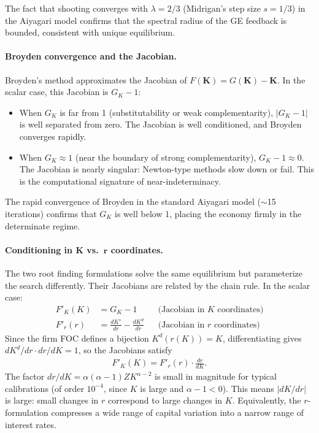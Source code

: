 \documentclass[12pt]{article}
\begin{document}
\noindent The fact that shooting converges with $\lambda = 2/3$ (Midrigan's step size $s = 1/3$) in the Aiyagari model confirms that the spectral radius of the GE feedback is bounded, consistent with unique equilibrium.

\paragraph{Broyden convergence and the Jacobian.} Broyden's method approximates the Jacobian of $F(\mathbf{K}) = G(\mathbf{K}) - \mathbf{K}$. In the scalar case, this Jacobian is $G_K - 1$:
\begin{itemize}[nosep]
    \item When $G_K$ is far from 1 (substitutability or weak complementarity), $|G_K - 1|$ is well separated from zero. The Jacobian is well conditioned, and Broyden converges rapidly.
    \item When $G_K \approx 1$ (near the boundary of strong complementarity), $G_K - 1 \approx 0$. The Jacobian is nearly singular: Newton-type methods slow down or fail. This is the computational signature of near-indeterminacy.
\end{itemize}

\noindent The rapid convergence of Broyden in the standard Aiyagari model ($\sim$15 iterations) confirms that $G_K$ is well below 1, placing the economy firmly in the determinate regime.

\paragraph{Conditioning in $\mathbf{K}$ vs.\ $\mathbf{r}$ coordinates.} The two root finding formulations solve the same equilibrium but parameterize the search differently. Their Jacobians are related by the chain rule. In the scalar case:
\begin{align}
    F'_K(K) &= G_K - 1 & &\text{(Jacobian in $K$ coordinates)} \label{eq:jac_K} \\
    F'_r(r) &= \frac{dK^s}{dr} - \frac{dK^d}{dr} & &\text{(Jacobian in $r$ coordinates)} \label{eq:jac_r}
\end{align}
Since the firm FOC defines a bijection $K^d(r(K)) = K$, differentiating gives $dK^d/dr \cdot dr/dK = 1$, so the Jacobians satisfy
\begin{align}
    F'_K(K) = F'_r(r) \cdot \frac{dr}{dK}. \label{eq:jacobian_change_of_vars}
\end{align}
The factor $dr/dK = \alpha(\alpha-1) Z K^{\alpha-2}$ is small in magnitude for typical calibrations (of order $10^{-4}$, since $K$ is large and $\alpha - 1 < 0$). This means $|dK/dr|$ is large: small changes in $r$ correspond to large changes in $K$. Equivalently, the $r$-formulation compresses a wide range of capital variation into a narrow range of interest rates.
\end{document}
